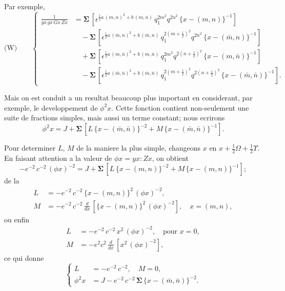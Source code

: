 \documentclass[11pt,a4paper]{article}
\begin{document}
Par exemple,
\begin{equation*}
\text{(W)}\qquad
\left\{
\begin{aligned}
\frac{1}{yx\, gx\, Gx\, Zx} &= \boldsymbol{\Sigma}\, [\epsilon^{\frac{1}{2}a\, (m, n)^2+b\, (m, n)}\, q_1^{2m^2} q^{2n^2}\, \{x - (m, n)\}^{-1}]\\
&\quad - \boldsymbol{\Sigma}\, [\epsilon^{\frac{1}{2}a\, (\bar{m}, n)^2+b\, (\bar{m}, n)}\, q_1^{2(m+\frac{1}{2})^2} q^{2n^2}\, \{x - (\bar{m}, n)\}^{-1}]\\
&\quad + \boldsymbol{\Sigma}\, [\epsilon^{\frac{1}{2}a\, (m, \bar{n})^2+b\, (m, \bar{n})}\, q_1^{2m^2} q^{2(n+\frac{1}{2})^2}\, \{x - (m, \bar{n})\}^{-1}]\\
&\quad - \boldsymbol{\Sigma}\, [\epsilon^{\frac{1}{2}a\, (\bar{m}, \bar{n})^2+b\, (\bar{m}, \bar{n})}\, q_1^{2(m+\frac{1}{2})^2} q^{2(n+\frac{1}{2})^2}\, \{x - (\bar{m}, \bar{n})\}^{-1}].
\end{aligned}
\right.
\end{equation*}

Mais on est conduit a un resultat beaucoup plus important en considerant, par
exemple, le developpement de $\phi^2 x$. Cette fonction contient non-seulement une suite
de fractions simples, mais aussi un terme constant; nous ecrirons
\begin{equation}
\phi^2 x = J + \boldsymbol{\Sigma}\, [L\, \{x - (\bar{m}, \bar{n})\}^{-2} + M\, \{x - (\bar{m}, \bar{n})\}^{-1}]. \tag{39}
\end{equation}

Pour determiner $L$, $M$ de la maniere la plus simple, changeons $x$ en $x + \frac{1}{2}\Omega + \frac{1}{2}\Upsilon$. En
faisant attention a la valeur de $\phi x = yx : Zx$, on obtient
\[-e^{-2}\, c^{-2}\, (\phi x)^{-2} = J + \boldsymbol{\Sigma}\, [L\, \{x - (m, n)\}^{-2} + M\, \{x - (m, n)\}^{-1}];\]
de la
\begin{align*}
L &= -e^{-2}\, c^{-2}\, \{x - (m, n)\}^2\, (\phi x)^{-2},\\
M &= -e^{-2}\, c^{-2}\, \frac{d}{dx}\, [\{x - (m, n)\}^2\, (\phi x)^{-2}],\quad x = (m, n),
\end{align*}
ou enfin
\begin{align*}
L &= -e^{-2}\, c^{-2}\, x^2\, (\phi x)^{-2},\quad \text{pour } x = 0,\\
M &= -e^{2} c^{2}\, \frac{d}{dx}\, [x^2\, (\phi x)^{-2}],
\end{align*}
ce qui donne
\begin{equation}
\left\{
\begin{aligned}
L &= -e^{-2}\, c^{-2},\quad M = 0,\\
\phi^2 x &= J - e^{-2}\, c^{-2}\, \boldsymbol{\Sigma}\, \{x - (\bar{m}, \bar{n})\}^{-2}.
\end{aligned}
\right. \tag{40}
\end{equation}
\end{document}
